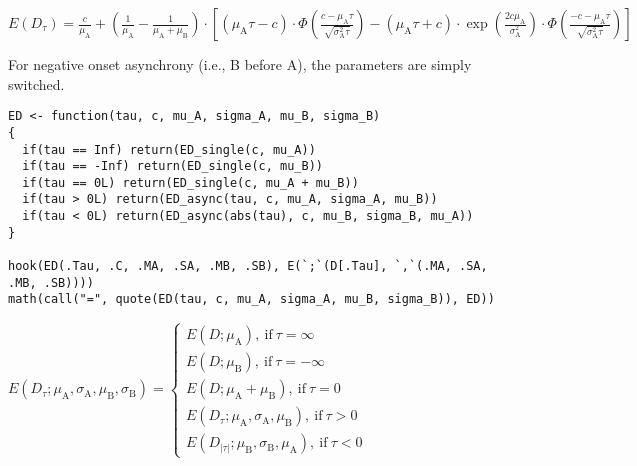 \({E{\left({D}_{\tau}\right)}}{=}{{\displaystyle{\frac{c}{{\mu}_{\mathrm{A}}}}}{+}{{\left({\displaystyle{\frac{1}{{\mu}_{\mathrm{A}}}}}{-}{\displaystyle{\frac{1}{{{\mu}_{\mathrm{A}}}{+}{{\mu}_{\mathrm{B}}}}}}\right)}{\cdot}{\left[{{\left({{{\mu}_{\mathrm{A}}}{{}}{\tau}}{-}{c}\right)}{\cdot}{\Phi{\left(\displaystyle{\frac{{c}{-}{{{\mu}_{\mathrm{A}}}{{}}{\tau}}}{\sqrt{{{\sigma}_{\mathrm{A}}^{2}}{{}}{\tau}}}}\right)}}}{-}{{{\left({{{\mu}_{\mathrm{A}}}{{}}{\tau}}{+}{c}\right)}{\cdot}{\exp{\left(\displaystyle{\frac{{{2}{{}}{c}}{{}}{{\mu}_{\mathrm{A}}}}{{\sigma}_{\mathrm{A}}^{2}}}\right)}}}{\cdot}{\Phi{\left(\displaystyle{\frac{{{-}{c}}{-}{{{\mu}_{\mathrm{A}}}{{}}{\tau}}}{\sqrt{{{\sigma}_{\mathrm{A}}^{2}}{{}}{\tau}}}}\right)}}}\right]}}}\)

For negative onset asynchrony (i.e., B before A), the parameters are
simply switched.

\begin{verbatim}
ED <- function(tau, c, mu_A, sigma_A, mu_B, sigma_B)
{
  if(tau == Inf) return(ED_single(c, mu_A))
  if(tau == -Inf) return(ED_single(c, mu_B))
  if(tau == 0L) return(ED_single(c, mu_A + mu_B))
  if(tau > 0L) return(ED_async(tau, c, mu_A, sigma_A, mu_B))
  if(tau < 0L) return(ED_async(abs(tau), c, mu_B, sigma_B, mu_A))
}

hook(ED(.Tau, .C, .MA, .SA, .MB, .SB), E(`;`(D[.Tau], `,`(.MA, .SA, .MB, .SB))))
math(call("=", quote(ED(tau, c, mu_A, sigma_A, mu_B, sigma_B)), ED))
\end{verbatim}

\({E{\left({{D}_{\tau}}{;}{{{\mu}_{\mathrm{A}}}{{,}{{\sigma}_{\mathrm{A}}}{{,}{{\mu}_{\mathrm{B}}}{{,}{{\sigma}_{\mathrm{B}}}}}}}\right)}}{=}{\left\{\begin{array}{l}{{E{\left({D}{;}{{\mu}_{\mathrm{A}}}\right)}},\ \mathrm{if}\ {{\tau}{=}{\infty}}}\\ {{E{\left({D}{;}{{\mu}_{\mathrm{B}}}\right)}},\ \mathrm{if}\ {{\tau}{=}{{-}{\infty}}}}\\ {{E{\left({D}{;}{{{\mu}_{\mathrm{A}}}{+}{{\mu}_{\mathrm{B}}}}\right)}},\ \mathrm{if}\ {{\tau}{=}{0}}}\\ {{E{\left({{D}_{\tau}}{;}{{{\mu}_{\mathrm{A}}}{{,}{{\sigma}_{\mathrm{A}}}{{,}{{\mu}_{\mathrm{B}}}}}}\right)}},\ \mathrm{if}\ {{\tau}{>}{0}}}\\ {{E{\left({{D}_{{\left\vert{\tau}\right\vert}}}{;}{{{\mu}_{\mathrm{B}}}{{,}{{\sigma}_{\mathrm{B}}}{{,}{{\mu}_{\mathrm{A}}}}}}\right)}},\ \mathrm{if}\ {{\tau}{<}{0}}}\end{array}\right.}\)

